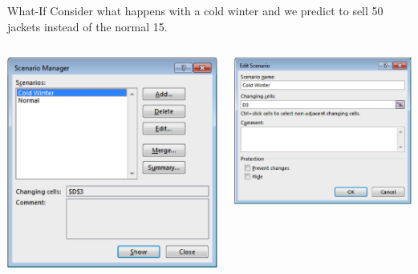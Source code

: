 \documentclass[xcolor=svgnames, handout]{beamer}
\newcommand{\red}[1]{\textcolor{red}{#1}}
\begin{document}

\begin{frame}{What-If}
Consider what happens with a cold winter and we predict to sell 50 jackets instead of the normal 15. %
\begin{columns}[T] %
\begin{column}{.48\textwidth}
\hspace*{10mm}\includegraphics[width=.9\textwidth]{whatif1.png}
\end{column}%
\hfill%
\begin{column}{.48\textwidth}
\hspace*{-6mm}\includegraphics[width=.9\textwidth]{whatif2.png}\\

\end{column}
\end{columns}
\end{frame}
\end{document}
